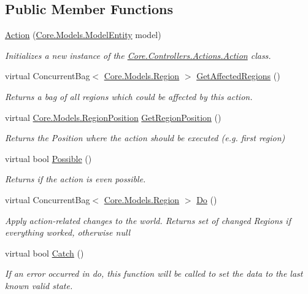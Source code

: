 \subsection*{Public Member Functions}
\begin{DoxyCompactItemize}
\item 
\hyperlink{classCore_1_1Controllers_1_1Actions_1_1Action_abb5103ff9280d2556e57a0fdaf090fe1}{Action} (\hyperlink{classCore_1_1Models_1_1ModelEntity}{Core.\+Models.\+Model\+Entity} model)
\begin{DoxyCompactList}\small\item\em Initializes a new instance of the \hyperlink{classCore_1_1Controllers_1_1Actions_1_1Action}{Core.\+Controllers.\+Actions.\+Action} class. \end{DoxyCompactList}\item 
virtual Concurrent\+Bag$<$ \hyperlink{classCore_1_1Models_1_1Region}{Core.\+Models.\+Region} $>$ \hyperlink{classCore_1_1Controllers_1_1Actions_1_1Action_aa11bdeffff43ec47ac7c3d6843a85674}{Get\+Affected\+Regions} ()
\begin{DoxyCompactList}\small\item\em Returns a bag of all regions which could be affected by this action. \end{DoxyCompactList}\item 
virtual \hyperlink{classCore_1_1Models_1_1RegionPosition}{Core.\+Models.\+Region\+Position} \hyperlink{classCore_1_1Controllers_1_1Actions_1_1Action_a6ffe3c30cb5648a81f50096f4f332d5a}{Get\+Region\+Position} ()
\begin{DoxyCompactList}\small\item\em Returns the Position where the action should be executed (e.\+g. first region) \end{DoxyCompactList}\item 
virtual bool \hyperlink{classCore_1_1Controllers_1_1Actions_1_1Action_a405b995343a9394ad19e05a699a4e6d9}{Possible} ()
\begin{DoxyCompactList}\small\item\em Returns if the action is even possible. \end{DoxyCompactList}\item 
virtual Concurrent\+Bag$<$ \hyperlink{classCore_1_1Models_1_1Region}{Core.\+Models.\+Region} $>$ \hyperlink{classCore_1_1Controllers_1_1Actions_1_1Action_afbb091ee28eee896951fac600188d446}{Do} ()
\begin{DoxyCompactList}\small\item\em Apply action-\/related changes to the world. Returns set of changed Regions if everything worked, otherwise null \end{DoxyCompactList}\item 
virtual bool \hyperlink{classCore_1_1Controllers_1_1Actions_1_1Action_ada4c77dfeee78ded10a6eb6a506defb4}{Catch} ()
\begin{DoxyCompactList}\small\item\em If an error occurred in do, this function will be called to set the data to the last known valid state. \end{DoxyCompactList}\end{DoxyCompactItemize}
